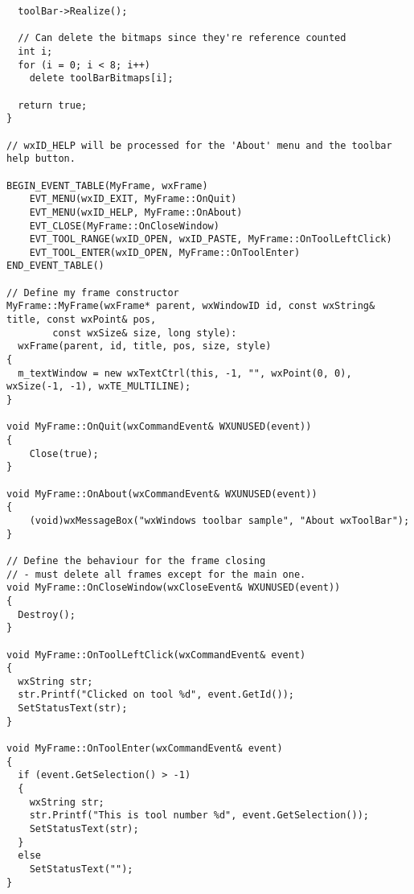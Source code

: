 {\begin{verbatim}
  toolBar->Realize();

  // Can delete the bitmaps since they're reference counted
  int i;
  for (i = 0; i < 8; i++)
    delete toolBarBitmaps[i];

  return true;
}

// wxID_HELP will be processed for the 'About' menu and the toolbar help button.

BEGIN_EVENT_TABLE(MyFrame, wxFrame)
    EVT_MENU(wxID_EXIT, MyFrame::OnQuit)
    EVT_MENU(wxID_HELP, MyFrame::OnAbout)
    EVT_CLOSE(MyFrame::OnCloseWindow)
    EVT_TOOL_RANGE(wxID_OPEN, wxID_PASTE, MyFrame::OnToolLeftClick)
    EVT_TOOL_ENTER(wxID_OPEN, MyFrame::OnToolEnter)
END_EVENT_TABLE()

// Define my frame constructor
MyFrame::MyFrame(wxFrame* parent, wxWindowID id, const wxString& title, const wxPoint& pos,
        const wxSize& size, long style):
  wxFrame(parent, id, title, pos, size, style)
{
  m_textWindow = new wxTextCtrl(this, -1, "", wxPoint(0, 0), wxSize(-1, -1), wxTE_MULTILINE);
}

void MyFrame::OnQuit(wxCommandEvent& WXUNUSED(event))
{
    Close(true);
}

void MyFrame::OnAbout(wxCommandEvent& WXUNUSED(event))
{
    (void)wxMessageBox("wxWindows toolbar sample", "About wxToolBar");
}

// Define the behaviour for the frame closing
// - must delete all frames except for the main one.
void MyFrame::OnCloseWindow(wxCloseEvent& WXUNUSED(event))
{
  Destroy();
}

void MyFrame::OnToolLeftClick(wxCommandEvent& event)
{
  wxString str;
  str.Printf("Clicked on tool %d", event.GetId());
  SetStatusText(str);
}

void MyFrame::OnToolEnter(wxCommandEvent& event)
{
  if (event.GetSelection() > -1)
  {
    wxString str;
    str.Printf("This is tool number %d", event.GetSelection());
    SetStatusText(str);
  }
  else
    SetStatusText("");
}
\end{verbatim}
}

